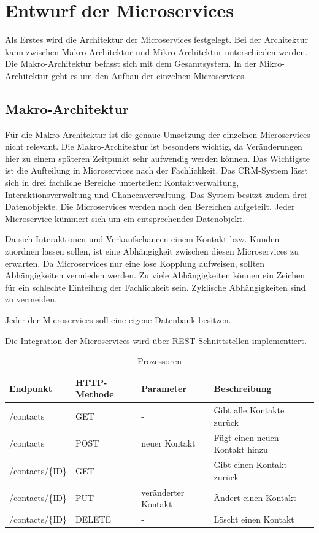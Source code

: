 \section{Entwurf der Microservices}

Als Erstes wird die Architektur der Microservices festgelegt. Bei der Architektur kann zwischen Makro-Architektur und Mikro-Architektur unterschieden werden. Die Makro-Architektur befasst sich mit dem Gesamtsystem. In der Mikro-Architektur geht es um den Aufbau der einzelnen Microservices.

\subsection{Makro-Architektur}

Für die Makro-Architektur ist die genaue Umsetzung der einzelnen Microservices nicht relevant. Die Makro-Architektur ist besonders wichtig, da Veränderungen hier zu einem späteren Zeitpunkt sehr aufwendig werden können. Das Wichtigste ist die Aufteilung in Microservices nach der Fachlichkeit.
Das CRM-System lässt sich in drei fachliche Bereiche unterteilen: Kontaktverwaltung, Interaktionsverwaltung und Chancenverwaltung.
Das System besitzt zudem drei Datenobjekte. Die Microservices werden nach den Bereichen aufgeteilt. Jeder Microservice kümmert sich um ein entsprechendes Datenobjekt.

Da sich Interaktionen und Verkaufschancen einem Kontakt bzw. Kunden zuordnen lassen sollen, ist eine Abhängigkeit zwischen diesen Microservices zu erwarten. Da Microservices nur eine lose Kopplung aufweisen, sollten Abhängigkeiten vermieden werden. Zu viele Abhängigkeiten können ein Zeichen für ein schlechte Einteilung der Fachlichkeit sein. Zyklische Abhängigkeiten sind zu vermeiden.

Jeder der Microservices soll eine eigene Datenbank besitzen.

Die Integration der Microservices wird über REST-Schnittstellen implementiert.

\begin{table}[H]
\centering
    \begin{tabular}[H]{l|l|l|l}
        Endpunkt & HTTP-Methode & Parameter & Beschreibung \\
        \hline
        /contacts & GET & - & Gibt alle Kontakte zurück \\
        \hline
        /contacts & POST & neuer Kontakt & Fügt einen neuen Kontakt hinzu \\
        \hline
        /contacts/\{ID\} & GET & - & Gibt einen Kontakt zurück \\
        \hline
        /contacts/\{ID\} & PUT & veränderter Kontakt & Ändert einen Kontakt \\
        \hline
        /contacts/\{ID\} & DELETE & - & Löscht einen Kontakt \\
        \hline
    \end{tabular}
    \caption{Prozessoren}
\end{table}

